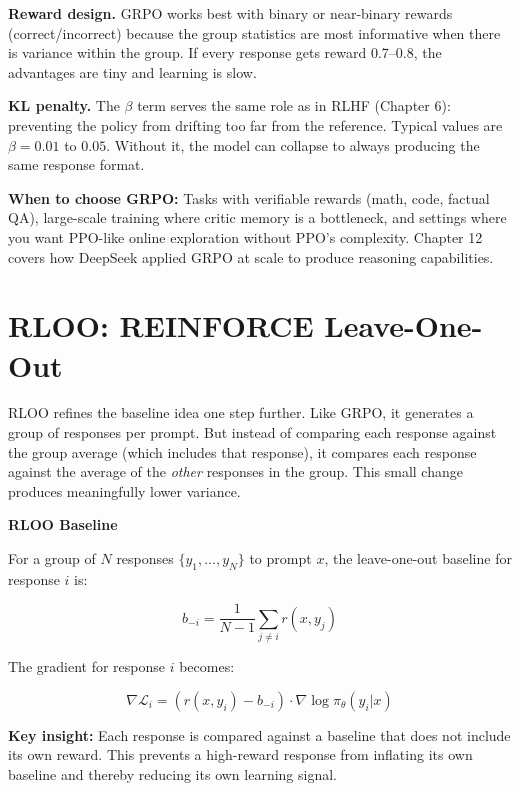 \begin{chapterenv}
\begin{infobox}
\textbf{Reward design.} GRPO works best with binary or near-binary rewards (correct/incorrect) because the group statistics are most informative when there is variance within the group. If every response gets reward 0.7--0.8, the advantages are tiny and learning is slow.

\textbf{KL penalty.} The $\beta$ term serves the same role as in RLHF (Chapter 6): preventing the policy from drifting too far from the reference. Typical values are $\beta = 0.01$ to $0.05$. Without it, the model can collapse to always producing the same response format.

\textbf{When to choose GRPO:} Tasks with verifiable rewards (math, code, factual QA), large-scale training where critic memory is a bottleneck, and settings where you want PPO-like online exploration without PPO's complexity. Chapter 12 covers how DeepSeek applied GRPO at scale to produce reasoning capabilities.
\end{infobox}

\section{RLOO: REINFORCE Leave-One-Out}



RLOO refines the baseline idea one step further. Like GRPO, it generates a group of responses per prompt. But instead of comparing each response against the group average (which includes that response), it compares each response against the average of the \textit{other} responses in the group. This small change produces meaningfully lower variance.

\begin{infobox}
\textbf{RLOO Baseline}

For a group of $N$ responses $\{y_1, \ldots, y_N\}$ to prompt $x$, the leave-one-out baseline for response $i$ is:

$$b_{-i} = \frac{1}{N-1}\sum_{j \neq i} r(x, y_j)$$

The gradient for response $i$ becomes:

$$\nabla \mathcal{L}_i = (r(x, y_i) - b_{-i}) \cdot \nabla \log \pi_\theta(y_i | x)$$

\textbf{Key insight:} Each response is compared against a baseline that does not include its own reward. This prevents a high-reward response from inflating its own baseline and thereby reducing its own learning signal.
\end{infobox}


\end{chapterenv}
